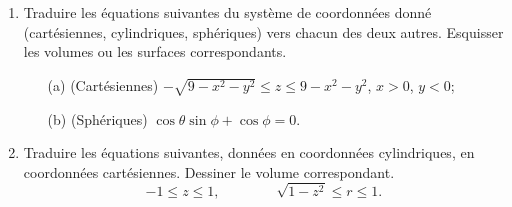 
\begin{exercice}\label{exodevoir2-0007}
  \begin{enumerate}
  \item Traduire les équations suivantes du système de coordonnées donné (cartésiennes, cylindriques, sphériques) vers chacun des deux autres. Esquisser les volumes ou les surfaces correspondants.  

    \begin{enumerate}
    \item[(a)] (Cartésiennes) $-\sqrt{ 9-x^2-y^2}\leq z\leq 9-x^2-y^2$, $x>0$, $y<0$;

    \item[(b)] (Sphériques) $\cos\theta\sin\phi+\cos\phi=0$. 
    \end{enumerate}
  \item Traduire les équations suivantes, données en coordonnées cylindriques, en coordonnées cartésiennes. Dessiner le volume correspondant. 
    \[
    -1\leq z\leq 1,\qquad\qquad \sqrt{1-z^2}\leq r\leq 1.
    \]
  \end{enumerate}
\end{exercice}


